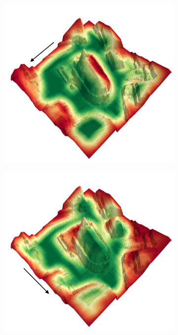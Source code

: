 \documentclass[../document.tex]{subfiles}
\begin{document}
\begin{figure} [htbp]
\begin{subfigure}[b]{0.45\textwidth}
        \includegraphics[width=\linewidth]{../img/4/traversability/sullens-church/-90.png}
    \end{subfigure}
    \begin{subfigure}[b]{0.45\textwidth}
      \includegraphics[width=\linewidth]{../img/4/traversability/sullens-church/-0.png}

\end{subfigure}
\end{figure}
\end{document}

